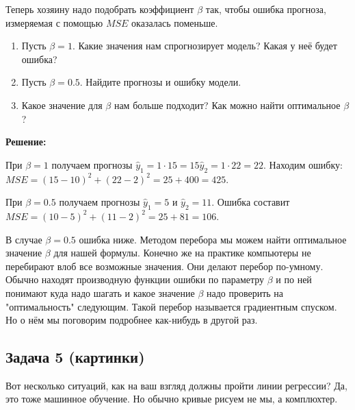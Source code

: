 \documentclass[12pt, a4paper, oneside]{article}
\begin{document}
Теперь хозяину надо подобрать коэффициент $\beta$ так, чтобы ошибка прогноза, измеряемая с помощью $MSE$ оказалась поменьше. 

\begin{enumerate} 
	\item  Пусть $\beta = 1$. Какие значения нам спрогнозирует модель? Какая у неё будет ошибка? 
	
	\item Пусть $\beta = 0.5$. Найдите прогнозы и ошибку модели. 
	
	\item  Какое значение для $\beta$ нам больше подходит? Как можно найти оптимальное $\beta$? 
\end{enumerate}  

\textbf{Решение:}

При $\beta = 1$ получаем прогнозы $\hat y_1 = 1 \cdot 15 = 15  \hat y_2 = 1 \cdot 22 = 22$. Находим ошибку: $MSE = (15 - 10)^2 + (22 - 2)^2 = 25 + 400 = 425$. 

При $\beta = 0.5$ получаем прогнозы $\hat y_1 = 5$ и $\hat y_2 = 11$. Ошибка составит $MSE = (10 - 5)^2 + (11 -2)^2 = 25 + 81 = 106$. 

В случае $\beta = 0.5$ ошибка ниже. Методом перебора мы можем найти оптимальное значение $\beta$ для нашей формулы. Конечно же на практике компьютеры не перебирают влоб все возможные значения. Они делают перебор по-умному. Обычно находят производную функции ошибки по параметру $\beta$ и по ней понимают куда надо шагать и какое значение $\beta$ надо проверить на "оптимальность" следующим. Такой перебор называется градиентным спуском.  Но о нём мы поговорим подробнее как-нибудь в другой раз. 


\subsection*{Задача 5 (картинки)}

Вот несколько ситуаций, как на ваш взгляд должны пройти линии регрессии? Да, это тоже машинное обучение. Но обычно кривые рисуем не мы, а комплюхтер.
\end{document}
